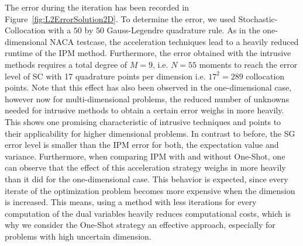 The error during the iteration has been recorded in Figure~\ref{fig:L2ErrorSolution2D}. To determine the error, we used Stochastic-Collocation with a $50$ by $50$ Gauss-Legendre quadrature rule. As in the one-dimensional NACA testcase, the acceleration techniques lead to a heavily reduced runtime of the IPM method. Furthermore, the error obtained with the intrusive methods requires a total degree of $M = 9$, i.e. $N = 55$ moments to reach the error level of SC with 17 quadrature points per dimension i.e. $17^2 = 289$ collocation points. Note that this effect has also been observed in the one-dimensional case, however now for multi-dimensional problems, the reduced number of unknowns needed for intrusive methods to obtain a certain error weighs in more heavily. This shows one promising characteristic of intrusive techniques and points to their applicability for higher dimensional problems. In contrast to before, the SG error level is smaller than the IPM error for both, the expectation value and variance. Furthermore, when comparing IPM with and without One-Shot, one can observe that the effect of this acceleration strategy weighs in more heavily than it did for the one-dimensional case. This behavior is expected, since every iterate of the optimization problem becomes more expensive when the dimension is increased. This means, using a method with less iterations for every computation of the dual variables heavily reduces computational costs, which is why we consider the One-Shot strategy an effective approach, especially for problems with high uncertain dimension.
